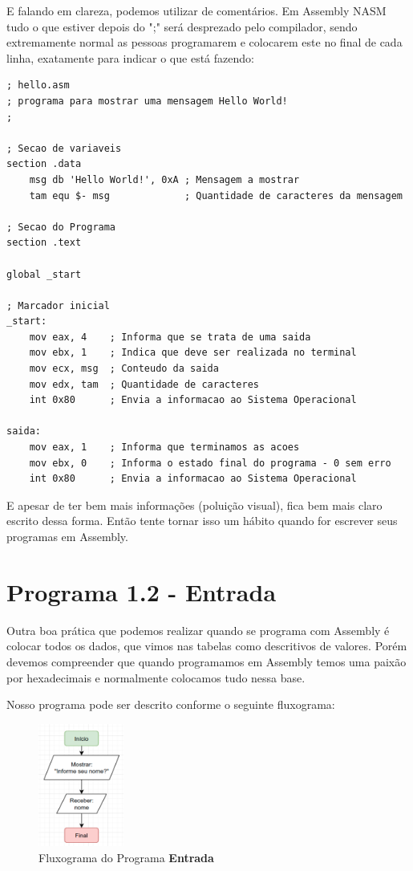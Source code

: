 E falando em clareza, podemos utilizar de comentários. Em Assembly NASM tudo o que estiver depois do ";" será desprezado pelo compilador, sendo extremamente normal as pessoas programarem e colocarem este no final de cada linha, exatamente para indicar o que está fazendo:
\begin{lstlisting}[]
; hello.asm
; programa para mostrar uma mensagem Hello World!
;

; Secao de variaveis
section .data
	msg db 'Hello World!', 0xA ; Mensagem a mostrar
	tam equ $- msg             ; Quantidade de caracteres da mensagem
	
; Secao do Programa	
section .text
	
global _start
	
; Marcador inicial	
_start:
	mov eax, 4    ; Informa que se trata de uma saida
	mov ebx, 1    ; Indica que deve ser realizada no terminal
	mov ecx, msg  ; Conteudo da saida
	mov edx, tam  ; Quantidade de caracteres
	int 0x80      ; Envia a informacao ao Sistema Operacional
	
saida:
	mov eax, 1    ; Informa que terminamos as acoes
	mov ebx, 0    ; Informa o estado final do programa - 0 sem erro
	int 0x80      ; Envia a informacao ao Sistema Operacional
\end{lstlisting}
 
E apesar de ter bem mais informações (poluição visual), fica bem mais claro escrito dessa forma. Então tente tornar isso um hábito quando for escrever seus programas em Assembly.

\section{Programa 1.2 - Entrada}
Outra boa prática que podemos realizar quando se programa com Assembly é colocar todos os dados, que vimos nas tabelas como descritivos de valores. Porém devemos compreender que quando programamos em Assembly temos uma paixão por hexadecimais e normalmente colocamos tudo nessa base.

Nosso programa pode ser descrito conforme o seguinte fluxograma:
\begin{figure}[H]
	\centering
	\includegraphics[width=0.25\textwidth]{Pictures/cap01/programa12}
	\caption{Fluxograma do Programa \textbf{Entrada}}
\end{figure}


